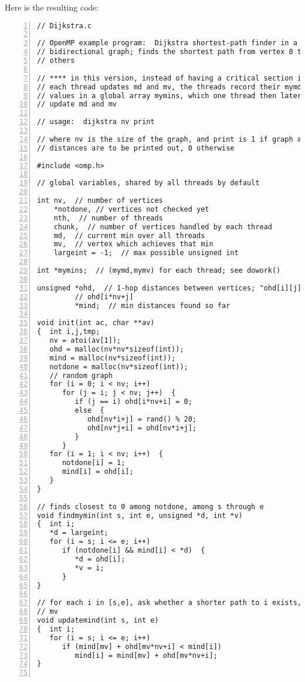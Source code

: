 Here is the resulting code:

\begin{Verbatim}[fontsize=\relsize{-2},numbers=left]
// Dijkstra.c

// OpenMP example program:  Dijkstra shortest-path finder in a
// bidirectional graph; finds the shortest path from vertex 0 to all
// others

// **** in this version, instead of having a critical section in which
// each thread updates md and mv, the threads record their mymd and mymv
// values in a global array mymins, which one thread then later uses to
// update md and mv

// usage:  dijkstra nv print

// where nv is the size of the graph, and print is 1 if graph and min
// distances are to be printed out, 0 otherwise

#include <omp.h>

// global variables, shared by all threads by default

int nv,  // number of vertices
    *notdone, // vertices not checked yet
    nth,  // number of threads
    chunk,  // number of vertices handled by each thread
    md,  // current min over all threads
    mv,  // vertex which achieves that min
    largeint = -1;  // max possible unsigned int

int *mymins;  // (mymd,mymv) for each thread; see dowork()

unsigned *ohd,  // 1-hop distances between vertices; "ohd[i][j]" is
         // ohd[i*nv+j]
         *mind;  // min distances found so far

void init(int ac, char **av)
{  int i,j,tmp;
   nv = atoi(av[1]);
   ohd = malloc(nv*nv*sizeof(int));
   mind = malloc(nv*sizeof(int));
   notdone = malloc(nv*sizeof(int));
   // random graph
   for (i = 0; i < nv; i++)
      for (j = i; j < nv; j++)  {
         if (j == i) ohd[i*nv+i] = 0;
         else  {
            ohd[nv*i+j] = rand() % 20;
            ohd[nv*j+i] = ohd[nv*i+j];
         }
      }
   for (i = 1; i < nv; i++)  {
      notdone[i] = 1;
      mind[i] = ohd[i];
   }
}

// finds closest to 0 among notdone, among s through e
void findmymin(int s, int e, unsigned *d, int *v)
{  int i;
   *d = largeint;
   for (i = s; i <= e; i++)
      if (notdone[i] && mind[i] < *d)  {
         *d = ohd[i];
         *v = i;
      }
}

// for each i in [s,e], ask whether a shorter path to i exists, through
// mv
void updatemind(int s, int e)
{  int i;
   for (i = s; i <= e; i++)
      if (mind[mv] + ohd[mv*nv+i] < mind[i])
         mind[i] = mind[mv] + ohd[mv*nv+i];
}


\end{Verbatim}

